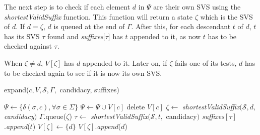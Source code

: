 {The next step is to check if each element $d$ in $\Psi$ are their own SVS using the \textit{shortestValidSuffix} function. This function will return a state $\zeta$ which is the SVS of $d$. If $d = \zeta$, $d$ is queued at the end of $\Gamma$. After this, for each descendant $t$ of $d$, $t$ has its SVS $\tau$ found and \textit{suffixes}[$\tau$] has $t$ appended to it, as now $t$ has to be checked against $\tau$.

When $\zeta \neq d$, $V[\zeta]$ has $d$ appended to it. Later on, if $\zeta$ fails one of its tests, $d$ has to be checked again to see if it is now its own SVS.

%
  
  \begin{algorithm}[t]
  \caption{expand($c, V, \mathcal{S},\Gamma,$ candidacy, suffixes)\label{alg:expand}}
    \begin{algorithmic}[1]
      	\State $\Psi \gets \{\delta(\sigma,c),\forall \sigma \in \Sigma\}$
      		\State $\Psi \gets \Psi \cup V[c]$
      		\State delete $V[c]$
      	\EndIf
      		\State $\zeta \gets $ \textit{shortestValidSuffix}$(\mathcal{S}, d,$ \textit{candidacy}$)$
      			\State $\Gamma$.queue($\zeta$)
      				\State $\tau \gets $ \textit{shortestValidSuffix}$(\mathcal{S}, t,$ candidacy$)$
      				\State \textit{suffixes}$[\tau]$.\textit{append}($t$)
      			\EndFor
      		\Else
      				\State $V[\zeta] \gets \{d\}$
      			\Else
      				\State $V[\zeta]$.\textit{append}($d$)
      			\EndIf
      		\EndIf
      	\EndFor
      \EndProcedure
    \end{algorithmic}
  \end{algorithm}

}
